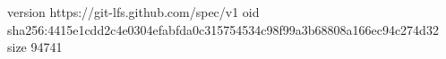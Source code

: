 version https://git-lfs.github.com/spec/v1
oid sha256:4415e1cdd2c4e0304efabfda0c315754534c98f99a3b68808a166ec94c274d32
size 94741
